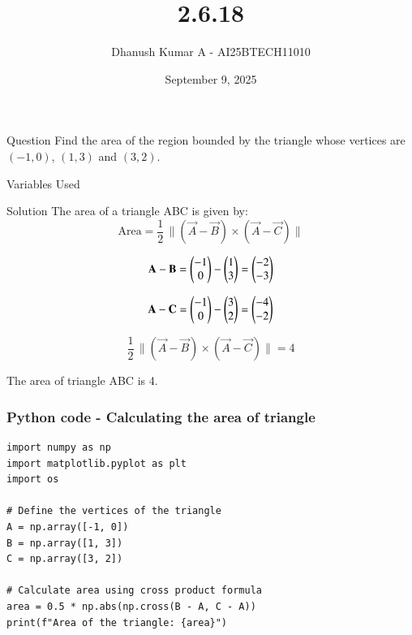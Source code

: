 \documentclass{beamer}
\title{2.6.18}
\author{Dhanush Kumar A - AI25BTECH11010}
\date{September 9, 2025}
\begin{document}
\frame{\titlepage}

\begin{frame}{Question}
Find the area of the region bounded by the triangle whose vertices are $(-1, 0)$, $(1, 3)$ and $(3, 2)$.
\end{frame}

\begin{frame}{Variables Used}
\begin{table}[H]    
  \centering
  \caption{Variables Used}
  \label{tab:variables}
\end{table}
\end{frame}


\begin{frame}{Solution}
The area of a triangle ABC is given by:  
\[
\text{Area} = \frac{1}{2} \, \lVert (\vec{A}-\vec{B}) \times (\vec{A}-\vec{C}) \rVert
\]

\[
\mathbf{A}-\mathbf{B} = \begin{pmatrix}-1 \\ 0\end{pmatrix} - \begin{pmatrix}1 \\ 3\end{pmatrix} = \begin{pmatrix}-2 \\ -3\end{pmatrix}
\]

\[
\mathbf{A}-\mathbf{C} = \begin{pmatrix}-1 \\ 0\end{pmatrix} - \begin{pmatrix}3 \\ 2\end{pmatrix} = \begin{pmatrix}-4 \\ -2\end{pmatrix}
\]

\[
\frac{1}{2}\,\lVert (\vec{A}-\vec{B}) \times (\vec{A}-\vec{C}) \rVert = 4
\]

The area of triangle ABC is 4.
\end{frame}

\begin{frame}[fragile]                            
\frametitle{Python code - Calculating the area of triangle}                
\begin{lstlisting}
import numpy as np
import matplotlib.pyplot as plt
import os

# Define the vertices of the triangle
A = np.array([-1, 0])
B = np.array([1, 3])
C = np.array([3, 2])

# Calculate area using cross product formula
area = 0.5 * np.abs(np.cross(B - A, C - A))
print(f"Area of the triangle: {area}")
\end{lstlisting}
\end{frame}
\end{document}

